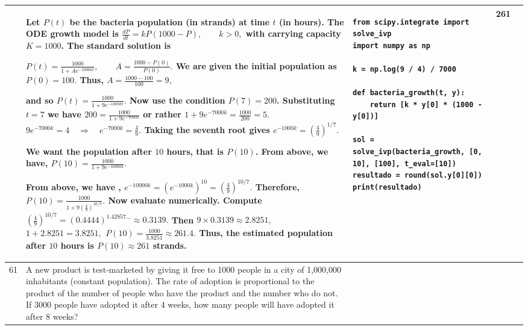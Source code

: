 \documentclass[a4paper,12pt]{article}
\begin{document}
\begin{longtable}{|p{0.3cm}|p{}|p{10cm}|p{}|p{1.5cm}|}
              &Let $P(t)$ be the bacteria population (in strands) at time $t$ (in hours). 
The ODE growth model is
$\displaystyle \frac{dP}{dt} = kP(1000 - P), \qquad k > 0,$
with carrying capacity $K = 1000$. The standard solution is

$\displaystyle P(t) = \frac{1000}{1 + A e^{-1000kt}},
\qquad A = \frac{1000 - P(0)}{P(0)}.$
We are given the initial population as 
$P(0) = 100.$ Thus, $A = \frac{1000 - 100}{100} = 9,$

and so $\displaystyle P(t) = \frac{1000}{1 + 9 e^{-1000kt}}.$ Now use the condition $P(7) = 200$. Substituting  $t = 7$ we have
$\displaystyle 200 = \frac{1000}{1 + 9 e^{-7000k}}$
or rather $\displaystyle 1 + 9 e^{-7000k} = \frac{1000}{200} = 5.$
$\displaystyle 9 e^{-7000k} = 4
\quad\Longrightarrow\quad
e^{-7000k} = \frac{4}{9}.$
Taking the seventh root gives
$\displaystyle e^{-1000k} = \left(\frac{4}{9}\right)^{1/7}. $

We want the population after $10$ hours, that is $P(10)$. From above, we have,
$\displaystyle P(10) = \frac{1000}{1 + 9 e^{-10000k}}.$

From above, we have , $\displaystyle e^{-10000k} = \left(e^{-1000k}\right)^{10}
= \left(\frac{4}{9}\right)^{10/7}.$
Therefore,$\displaystyle P(10) = \frac{1000}{1 + 9 \left(\frac{4}{9}\right)^{10/7}}.$
Now evaluate numerically. Compute
$\displaystyle \left(\frac{4}{9}\right)^{10/7}
= (0.4444)^{1.42857\ldots}
\approx 0.3139.$ Then $9 \times 0.3139 \approx 2.8251,$
$1 + 2.8251 = 3.8251,$
$\displaystyle P(10) = \frac{1000}{3.8251} \approx 261.4.$
Thus, the estimated population after $10$ hours is $P(10) \approx 261$ strands.

 &\begin{verbatim}
from scipy.integrate import solve_ivp
import numpy as np

k = np.log(9 / 4) / 7000

def bacteria_growth(t, y):
    return [k * y[0] * (1000 - y[0])]

sol = solve_ivp(bacteria_growth, [0, 10], [100], t_eval=[10])
resultado = round(sol.y[0][0])
print(resultado)
\end{verbatim}& 261 \\ \hline 
 61           & A new product is test‑marketed by giving it free to 1000 people in a city of 1,000,000 inhabitants (constant population). The rate of adoption is proportional to the product of the number of people who have the product and the number who do not. If 3000 people have adopted it after 4 weeks, how many people will have adopted it after 8 weeks?



\end{longtable}
\end{document}

